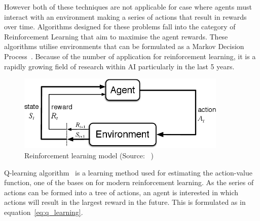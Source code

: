 However both of these techniques are not applicable for case where agents must interact with an environment making a
series of actions that result in rewards over time. Algorithms designed for these problems fall into the category of
Reinforcement Learning that aim to maximise the agent rewards. These algorithms utilise environments that can be
formulated as a Markov Decision Process~\citep{Bel}. Because of the number of application for reinforcement learning,
it is a rapidly growing field of research within AI particularly in the last 5 years.


\begin{figure}[h]
    \includegraphics[width=10cm]{figures/reinforcement_learning.png}
    \caption{Reinforcement learning model (Source: ~\cite{Sutton1998})}
    \label{fig:reinforcement_learning}
\end{figure}


Q-learning algorithm~\cite{watkins1992q-learning} is a learning method used for estimating the action-value function,
one of the bases on for modern reinforcement learning. As the series of actions can be formed into a tree of
actions, an agent is interested in which actions will result in the largest reward in the future. This is formulated
as in equation~\eqref{eq:q_learning}.

